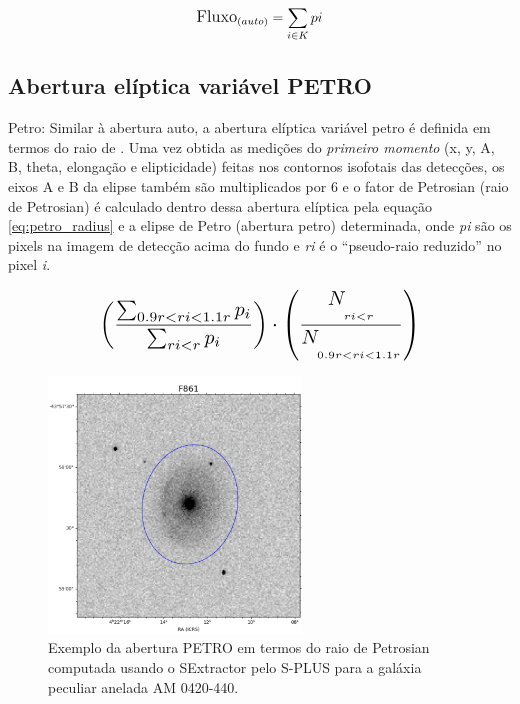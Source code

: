 \begin{equation} \label{eq:kron_flux}
\large
\text{Fluxo}_{(auto)} = \sum_{i \in K} pi
\end{equation}

\subsection{Abertura elíptica variável PETRO}
Petro: Similar à abertura auto, a abertura elíptica variável petro é definida em termos do raio de . Uma vez obtida as medições do \emph{primeiro momento} (x, y, A, B, theta, elongação e elipticidade) feitas nos contornos isofotais das detecções, os eixos A e B da elipse também são multiplicados por 6 e o fator de Petrosian (raio de Petrosian) é calculado dentro dessa abertura elíptica pela equação \ref{eq:petro_radius} e a elipse de Petro (abertura petro) determinada, onde \emph{pi} são os pixels na imagem de detecção acima do fundo e \emph{ri} é o ``pseudo-raio reduzido'' no pixel \emph{i}.

\begin{equation} \label{eq:petro_radius}
\scalebox{1.4}{$\displaystyle \left(\frac{\sum_{0.9r<ri<1.1r} p_i}{\sum_{ri<r} p_i}\right) \cdot \left(\frac{N_{\underset{ri<r}{\ }}}{N_{\underset{0.9r<ri<1.1r}{\ }}}\right)$}
\end{equation}

\begin{figure}[h]
  \centering 
  \includegraphics[width=0.6\textwidth]{Imagens/petro_exemplo.PNG} 
  \caption[Exemplo da abertura PETRO para a galáxia AM 0420-440.]{Exemplo da abertura PETRO em termos do raio de Petrosian computada usando o SExtractor pelo S-PLUS para a galáxia peculiar anelada AM 0420-440.}
  \label{fig:petro_exemplo} 
\end{figure}

